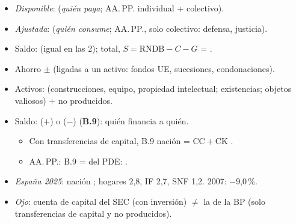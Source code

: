 \documentclass{article}
\begin{document}
\begin{columnas}
\begin{itemize}
\end{itemize}
\begin{itemize}
\item \emph{Disponible}:  (\emph{quién paga}; AA.\,PP. individual + colectivo).
\item \emph{Ajustada}:  (\emph{quién consume}; AA.\,PP., solo colectivo: defensa, justicia).
\item Saldo:  (igual en las 2); total, $S=\mathrm{RNDB}-C-G$ = .
\end{itemize}

\begin{itemize}
\item Ahorro $\pm$  (ligadas a un activo: fondos UE, sucesiones, condonaciones).
\item Activos:  (construcciones, equipo, propiedad intelectual; existencias; objetos valiosos) + no producidos.
\item Saldo:  ($+$) o  ($-$)  (\textbf{B.9}): quién financia a quién.
  \begin{itemize}
  \item Con transferencias de capital, B.9 nación = $\mathrm{CC}+\mathrm{CK}$ .
  \item AA.\,PP.: B.9 =  del PDE:  .
  \end{itemize}
\item \emph{España 2025}: nación ; hogares 2,8, IF 2,7, SNF 1,2. 2007: $-$9,0\,\%.
\end{itemize}
\begin{itemize}
\item \emph{Ojo}: cuenta de capital del SEC (con inversión) $\neq$ la de la BP (solo transferencias de capital y no producidos).
\end{itemize}
\begin{itemize}

\end{itemize}
\end{columnas}
\end{document}
